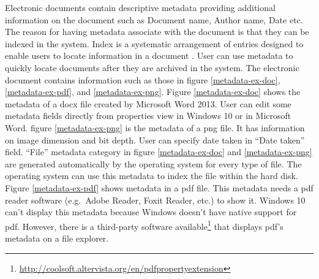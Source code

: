 Electronic documents contain descriptive metadata providing additional information on the document such as Document name, Author name, Date etc.
The reason for having metadata associate with the document is that they can be indexed in the system.
Index is a systematic arrangement of entries designed to enable users to locate information in a document \cite{def-index}.
User can use metadata to quickly locate documents after they are archived in the system.
The electronic document contains information such as those in figure \ref{metadata-ex-doc}, \ref{metadata-ex-pdf}, and \ref{metadata-ex-png}.
Figure \ref{metadata-ex-doc} shows the metadata of a docx file created by Microsoft Word 2013.
User can edit some metadata fields directly from properties view in Windows 10 or in Microsoft Word.
figure \ref{metadata-ex-png} is the metadata of a \gls{png} file.
It has information on image dimension and bit depth.
User can specify date taken in \enquote{Date taken} field.
\enquote{File} metadata category in figure \ref{metadata-ex-doc} and \ref{metadata-ex-png} are generated automatically by the operating system for every type of file.
The operating system can use this metadata to index the file within the hard disk.
Figure \ref{metadata-ex-pdf} shows metadata in a \gls{pdf} file.
This metadata needs a \gls{pdf} reader software (e.g.\ Adobe Reader, Foxit Reader, etc.) to show it.
Windows 10 can't display this metadata because Windows doesn't have native support for \gls{pdf}.
However, there is a third-party software available\footnote{\url{http://coolsoft.altervista.org/en/pdfpropertyextension}} that displays \gls{pdf}'s metadata on a file explorer.
